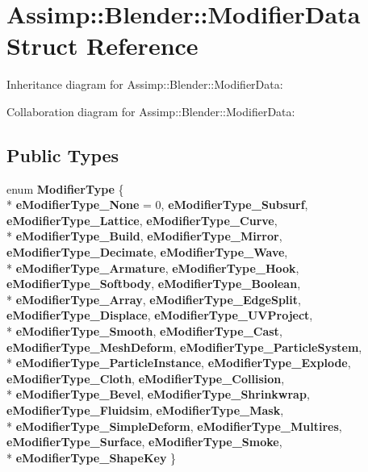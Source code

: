 \hypertarget{struct_assimp_1_1_blender_1_1_modifier_data}{\section{Assimp\+:\+:Blender\+:\+:Modifier\+Data Struct Reference}
\label{struct_assimp_1_1_blender_1_1_modifier_data}
}


Inheritance diagram for Assimp\+:\+:Blender\+:\+:Modifier\+Data\+:


Collaboration diagram for Assimp\+:\+:Blender\+:\+:Modifier\+Data\+:
\subsection*{Public Types}
\begin{DoxyCompactItemize}
\item 
\hypertarget{struct_assimp_1_1_blender_1_1_modifier_data_abf9bc8d2d13fa43660a28b9154e68124}{enum {\bfseries Modifier\+Type} \{ \\*
{\bfseries e\+Modifier\+Type\+\_\+\+None} = 0, 
{\bfseries e\+Modifier\+Type\+\_\+\+Subsurf}, 
{\bfseries e\+Modifier\+Type\+\_\+\+Lattice}, 
{\bfseries e\+Modifier\+Type\+\_\+\+Curve}, 
\\*
{\bfseries e\+Modifier\+Type\+\_\+\+Build}, 
{\bfseries e\+Modifier\+Type\+\_\+\+Mirror}, 
{\bfseries e\+Modifier\+Type\+\_\+\+Decimate}, 
{\bfseries e\+Modifier\+Type\+\_\+\+Wave}, 
\\*
{\bfseries e\+Modifier\+Type\+\_\+\+Armature}, 
{\bfseries e\+Modifier\+Type\+\_\+\+Hook}, 
{\bfseries e\+Modifier\+Type\+\_\+\+Softbody}, 
{\bfseries e\+Modifier\+Type\+\_\+\+Boolean}, 
\\*
{\bfseries e\+Modifier\+Type\+\_\+\+Array}, 
{\bfseries e\+Modifier\+Type\+\_\+\+Edge\+Split}, 
{\bfseries e\+Modifier\+Type\+\_\+\+Displace}, 
{\bfseries e\+Modifier\+Type\+\_\+\+U\+V\+Project}, 
\\*
{\bfseries e\+Modifier\+Type\+\_\+\+Smooth}, 
{\bfseries e\+Modifier\+Type\+\_\+\+Cast}, 
{\bfseries e\+Modifier\+Type\+\_\+\+Mesh\+Deform}, 
{\bfseries e\+Modifier\+Type\+\_\+\+Particle\+System}, 
\\*
{\bfseries e\+Modifier\+Type\+\_\+\+Particle\+Instance}, 
{\bfseries e\+Modifier\+Type\+\_\+\+Explode}, 
{\bfseries e\+Modifier\+Type\+\_\+\+Cloth}, 
{\bfseries e\+Modifier\+Type\+\_\+\+Collision}, 
\\*
{\bfseries e\+Modifier\+Type\+\_\+\+Bevel}, 
{\bfseries e\+Modifier\+Type\+\_\+\+Shrinkwrap}, 
{\bfseries e\+Modifier\+Type\+\_\+\+Fluidsim}, 
{\bfseries e\+Modifier\+Type\+\_\+\+Mask}, 
\\*
{\bfseries e\+Modifier\+Type\+\_\+\+Simple\+Deform}, 
{\bfseries e\+Modifier\+Type\+\_\+\+Multires}, 
{\bfseries e\+Modifier\+Type\+\_\+\+Surface}, 
{\bfseries e\+Modifier\+Type\+\_\+\+Smoke}, 
\\*
{\bfseries e\+Modifier\+Type\+\_\+\+Shape\+Key}
 \}}\label{struct_assimp_1_1_blender_1_1_modifier_data_abf9bc8d2d13fa43660a28b9154e68124}

\end{DoxyCompactItemize}
